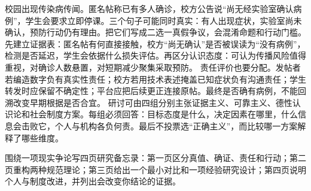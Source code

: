 校园出现传染病传闻。匿名帖称已有多人确诊，校方公告说“尚无经实验室确认病例”，学生会要求立即停课。三个句子可能同时真实：有人出现症状，实验室尚未确认，预防行动仍有理由。把它们写成二选一真假争议，会混淆命题和行动门槛。 先建立证据表：匿名帖有何直接接触，校方“尚无确认”是否被误读为“没有病例”，检测是否延迟，学生会依据什么损失评估。再区分认识态度：可认为传播风险值得重视，对确诊人数悬置，对短期减少聚集采取预防。 责任评价也要分配。发帖者若编造数字负有真实性责任；校方若用技术表述掩盖已知症状负有沟通责任；学生转发时应保留不确定性；平台应把后续更正连接原帖。最终是否确有病例，不能回溯改变早期根据是否合宜。 研讨可由四组分别主张证据主义、可靠主义、德性认识论和社会制度方案。每组必须回答：目标态度是什么，决定因素在哪里，什么信息会击败它，个人与机构各负何责。最后不投票选“正确主义”，而比较哪一方案解释了哪些维度。

\begin{tcolorbox}[breakable,colback=white,colframe=blue!30!black,title={专题研讨任务},fonttitle=\bfseries]
围绕一项现实争论写四页研究备忘录：第一页区分真值、确证、责任和行动；第二页重构两种规范理论；第三页给出一个最小对比和一项经验研究设计；第四页说明个人与制度改进，并列出会改变你结论的证据。
\end{tcolorbox}
